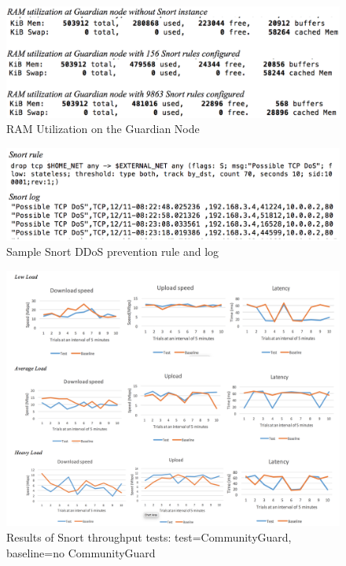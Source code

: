 \begin{figure}[b]
    \includegraphics[width=0.8\columnwidth]{figs/SnortRam.png}
    \caption{RAM Utilization on the Guardian Node}
    \label{fig:ramutil}
\end{figure}


\begin{figure}
	\centering
	\includegraphics[width=\columnwidth]{figs/ddosrule.png}
	\caption{Sample Snort DDoS prevention rule and log}
	\label{fig:snortrule1}
\end{figure}

\begin{figure}
	\centering
	\includegraphics[width=0.75\linewidth]{figs/graph.png}
	\caption{Results of Snort throughput tests: test=CommunityGuard, baseline=no CommunityGuard}
	\label{fig:graph}
\end{figure}

